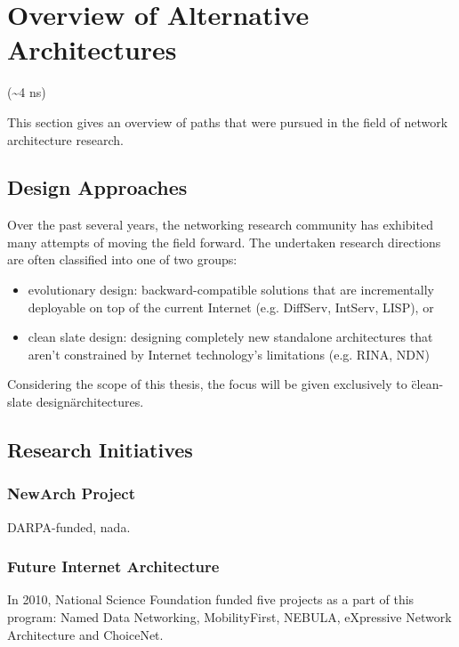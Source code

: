 \chapter{Overview of Alternative Architectures}
    (\textasciitilde4 ns)

    This section gives an overview of paths that were pursued in the field of network architecture research.

    \section{Design Approaches}

        Over the past several years, the networking research community has exhibited many attempts of moving the field forward. The undertaken research directions are often classified into one of two groups:

        \begin{itemize}
            \item evolutionary design: backward-compatible solutions that are incrementally deployable on top of the current Internet (e.g. DiffServ, IntServ, LISP), or
            \item clean slate design: designing completely new standalone architectures that aren't constrained by Internet technology's limitations (e.g. RINA, NDN)
        \end{itemize}

        Considering the scope of this thesis, the focus will be given exclusively to \"clean-slate design\" architectures.

    \section{Research Initiatives}

        \subsection{NewArch Project}

            DARPA-funded, nada.

        \subsection{Future Internet Architecture}

            In 2010, National Science Foundation funded five projects as a part of this program: Named Data Networking, MobilityFirst, NEBULA, eXpressive Network Architecture and ChoiceNet.

